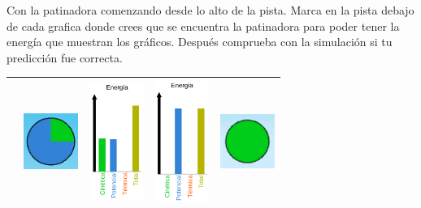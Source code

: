 \question[10] Con la patinadora comenzando desde lo alto de la pista.  Marca en la pista debajo de cada grafica donde crees que se encuentra la patinadora para poder tener la energía que muestran los gráficos. Después comprueba con la simulación si tu predicción fue correcta.

\begin{table}[H]
    \centering
    \begin{tabular}{|p{1.8cm}|c|c|c|c|}
        \hline
                                            & \includegraphics[width=50pt]{../images/pie}    & \includegraphics[width=50pt]{../images/bars}   & \includegraphics[width=50pt]{../images/bars_potential} & \includegraphics[width=50pt]{../images/pie_green} \\ \hline

\end{tabular}
\end{table}
